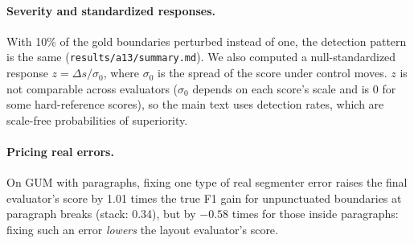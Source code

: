 \paragraph{Severity and standardized responses.} With 10\% of the gold boundaries perturbed instead of one, the
detection pattern is the same (\texttt{results/a13/summary.md}). We also computed a null-standardized response
$z = \Delta s / \sigma_0$, where $\sigma_0$ is the spread of the score under control moves. $z$ is not comparable
across evaluators ($\sigma_0$ depends on each score's scale and is 0 for some hard-reference scores), so the main text
uses detection rates, which are scale-free probabilities of superiority.

\paragraph{Pricing real errors.} On GUM with paragraphs, fixing one type of real segmenter error raises the final
evaluator's score by 1.01 times the true F1 gain for unpunctuated boundaries at paragraph breaks (stack: 0.34), but by
$-0.58$ times for those inside paragraphs: fixing such an error \emph{lowers} the layout evaluator's score.
